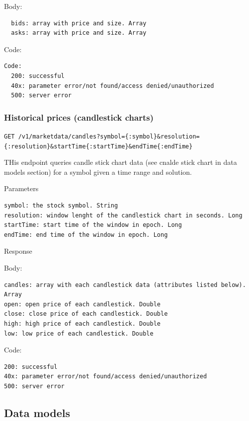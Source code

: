 \documentclass{report}
\theoremstyle{definition}
\let\oldsubsection\subsection
\let\oldsubsubsection\subsubsection
\renewcommand{\subsection}{\oldsubsection*}
\renewcommand{\subsubsection}{\oldsubsubsection*}
\begin{document}
Body:

\begin{lstlisting}
  bids: array with price and size. Array
  asks: array with price and size. Array
\end{lstlisting}

Code:

\begin{lstlisting}
Code:
  200: successful
  40x: parameter error/not found/access denied/unauthorized
  500: server error
\end{lstlisting}

\subsubsection{Historical prices (candlestick charts)}

\lstinline|GET /v1/marketdata/candles?symbol={:symbol}&resolution={:resolution}&startTime{:startTime}&endTime{:endTime}|

THis endpoint queries candle stick chart data (see cnalde stick chart in data models section) for a symbol given a time range and solution.

Parameters

\begin{lstlisting}
symbol: the stock symbol. String
resolution: window lenght of the candlestick chart in seconds. Long
startTime: start time of the window in epoch. Long
endTime: end time of the window in epoch. Long
\end{lstlisting}

Response

Body:

\begin{lstlisting}
candles: array with each candlestick data (attributes listed below). Array
open: open price of each candlestick. Double
close: close price of each candlestick. Double
high: high price of each candlestick. Double
low: low price of each candlestick. Double
\end{lstlisting}

Code:

\begin{lstlisting}
200: successful
40x: parameter error/not found/access denied/unauthorized
500: server error
\end{lstlisting}

\subsection{Data models}
\end{document}
